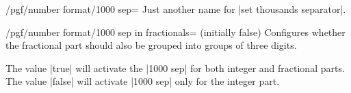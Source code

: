 \begin{key}{/pgf/number format/1000 sep=}
    Just another name for |set thousands separator|.
\end{key}

\begin{key}{/pgf/number format/1000 sep in fractionals= (initially false)}
    Configures whether the fractional part should also be grouped into groups
    of three digits.

    The value |true| will activate the |1000 sep| for both integer and
    fractional parts. The value |false| will activate |1000 sep| only for the
    integer part.
\begin{codeexample}[pre={\begin{lateximage}},post={\end{lateximage}}]
\end{codeexample}

\begin{codeexample}[pre={\begin{lateximage}},post={\end{lateximage}}]
\end{codeexample}
\end{key}

